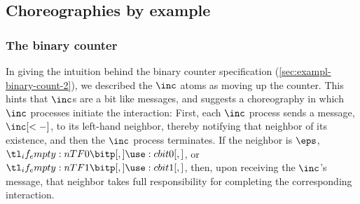 \documentclass[
  class=../hdeyoung-proposal,
  crop=false
]{standalone}
\begin{document}
\subsection{Choreographies by example}\label{sec:chor-by-example}

\subsubsection{The binary counter}\label{sec:chor-example-counter}

In giving the intuition behind the binary counter specification (\cref{sec:exampl-binary-count-2}), we described the $\inc$ atoms %
as moving up the counter.
This hints that $\inc$s are a bit like messages, and suggests a choreography in which $\inc$ processes initiate the interaction:
First, each $\inc$ process sends a message, $\inc[<-]$, to its left-hand neighbor, thereby notifying that neighbor of its existence, and then the $\inc$ process terminates.
If the neighbor is $\eps$, $\bit{0}$, or $\bit{1}$, then, upon receiving the $\inc$'s message, that neighbor takes full responsibility for completing the corresponding interaction.
\end{document}
